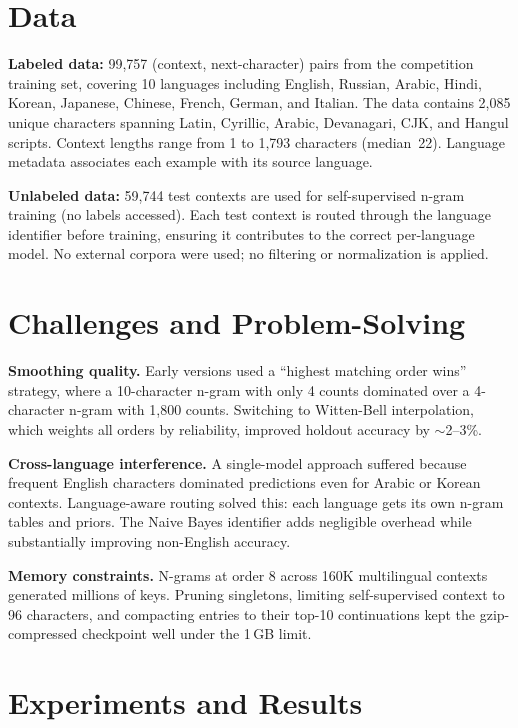 \documentclass[11pt]{article}
\begin{document}
\section{Data}

\textbf{Labeled data:} 99,757 (context, next-character) pairs from the competition training set, covering 10 languages including English, Russian, Arabic, Hindi, Korean, Japanese, Chinese, French, German, and Italian. The data contains 2,085 unique characters spanning Latin, Cyrillic, Arabic, Devanagari, CJK, and Hangul scripts. Context lengths range from 1 to 1,793 characters (median~22). Language metadata associates each example with its source language.

\textbf{Unlabeled data:} 59,744 test contexts are used for self-supervised n-gram training (no labels accessed). Each test context is routed through the language identifier before training, ensuring it contributes to the correct per-language model. No external corpora were used; no filtering or normalization is applied.

\section{Challenges and Problem-Solving}

\textbf{Smoothing quality.}
Early versions used a ``highest matching order wins'' strategy, where a 10-character n-gram with only 4 counts dominated over a 4-character n-gram with 1,800 counts. Switching to Witten-Bell interpolation, which weights all orders by reliability, improved holdout accuracy by ${\sim}$2--3\%.

\textbf{Cross-language interference.}
A single-model approach suffered because frequent English characters dominated predictions even for Arabic or Korean contexts. Language-aware routing solved this: each language gets its own n-gram tables and priors. The Naive Bayes identifier adds negligible overhead while substantially improving non-English accuracy.

\textbf{Memory constraints.}
N-grams at order 8 across 160K multilingual contexts generated millions of keys. Pruning singletons, limiting self-supervised context to 96 characters, and compacting entries to their top-10 continuations kept the gzip-compressed checkpoint well under the 1\,GB limit.

\section{Experiments and Results}
\end{document}
